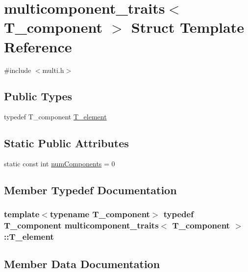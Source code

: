 \hypertarget{structmulticomponent__traits}{}\section{multicomponent\+\_\+traits$<$ T\+\_\+component $>$ Struct Template Reference}
\label{structmulticomponent__traits}


{\ttfamily \#include $<$multi.\+h$>$}

\subsection*{Public Types}
\begin{DoxyCompactItemize}
\item 
typedef T\+\_\+component \hyperlink{structmulticomponent__traits_ab79d34adea14fe9200c0554260db1746}{T\+\_\+element}
\end{DoxyCompactItemize}
\subsection*{Static Public Attributes}
\begin{DoxyCompactItemize}
\item 
static const int \hyperlink{structmulticomponent__traits_a06d5141cceb4a3c652272b7685997e83}{num\+Components} = 0
\end{DoxyCompactItemize}


\subsection{Member Typedef Documentation}
\hypertarget{structmulticomponent__traits_ab79d34adea14fe9200c0554260db1746}{}
\subsubsection[{T\+\_\+element}]{\setlength{\rightskip}{0pt plus 5cm}template$<$typename T\+\_\+component$>$ typedef T\+\_\+component {\bf multicomponent\+\_\+traits}$<$ T\+\_\+component $>$\+::{\bf T\+\_\+element}}\label{structmulticomponent__traits_ab79d34adea14fe9200c0554260db1746}


\subsection{Member Data Documentation}
\hypertarget{structmulticomponent__traits_a06d5141cceb4a3c652272b7685997e83}{}
